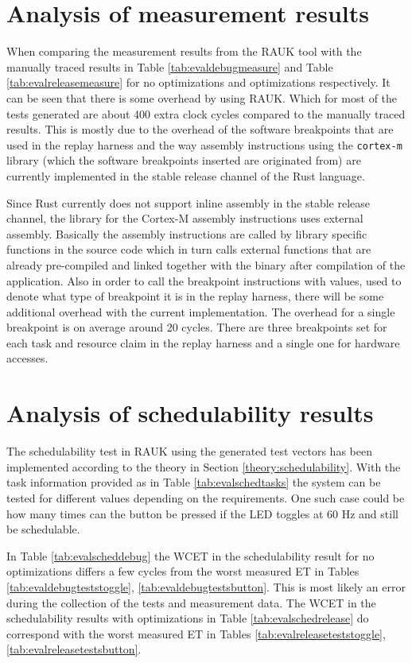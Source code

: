 \section{Analysis of measurement results}
When comparing the measurement results from the RAUK tool with the manually
traced results in Table \ref{tab:evaldebugmeasure} and Table
\ref{tab:evalreleasemeasure} for no optimizations and optimizations
respectively. It can be seen that there is some overhead by using RAUK. Which
for most of the tests generated are about 400 extra clock cycles compared to
the manually traced results. This is mostly due to the overhead of the software
breakpoints that are used in the replay harness and the way assembly
instructions using the \texttt{cortex-m} library (which the software
breakpoints inserted are originated from) are currently implemented in the
stable release channel of the Rust language.

Since Rust currently does not support inline assembly in the stable release
channel, the library for the Cortex-M assembly instructions uses external
assembly. Basically the assembly instructions are called by library specific
functions in the source code which in turn calls external functions that are
already pre-compiled and linked together with the binary after compilation of
the application. Also in order to call the breakpoint instructions with values,
used to denote what type of breakpoint it is in the replay harness, there will
be some additional overhead with the current implementation. The overhead for a
single breakpoint is on average around 20 cycles. There are three breakpoints
set for each task and resource claim in the replay harness and a single one for
hardware accesses.

\section{Analysis of schedulability results}
The schedulability test in RAUK using the generated test vectors has been
implemented according to the theory in Section \ref{theory:schedulability}.
With the task information provided as in Table \ref{tab:evalschedtasks} the
system can be tested for different values depending on the requirements. One
such case could be how many times can the button be pressed if the LED toggles
at 60 Hz and still be schedulable.

In Table \ref{tab:evalscheddebug} the WCET in the schedulability result for no
optimizations differs a few cycles from the worst measured ET in Tables
\ref{tab:evaldebugteststoggle}, \ref{tab:evaldebugtestsbutton}. This is most
likely an error during the collection of the tests and measurement data. The
WCET in the schedulability results with optimizations in Table
\ref{tab:evalschedrelease} do correspond with the worst measured ET in Tables
\ref{tab:evalreleaseteststoggle}, \ref{tab:evalreleasetestsbutton}.

